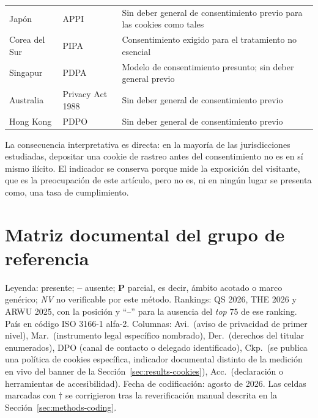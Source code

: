 \documentclass[pdflatex,sn-basic,Numbered]{sn-jnl}
\newcommand{\si}{\ding{51}}
\newcommand{\no}{\textcolor{gris}{\textbf{--}}}
\newcommand{\nv}{\textsl{\footnotesize NV}}
\theoremstyle{thmstyleone}
\theoremstyle{thmstyletwo}
\theoremstyle{thmstylethree}
\begin{document}
\begin{appendices}
\begin{longtable}{@{}>{\RaggedRight}p{2.4cm}>{\RaggedRight}p{5.5cm}>{\RaggedRight\arraybackslash}p{4.1cm}@{}}
	\addlinespace
	Jap\'on & APPI \citep{appi2003} & Sin deber general de consentimiento previo para las cookies como tales \\
	\addlinespace
	Corea del Sur & PIPA \citep{pipa2011} & Consentimiento exigido para el tratamiento no esencial \\
	\addlinespace
	Singapur & PDPA \citep{pdpa2012} & Modelo de consentimiento presunto; sin deber general previo \\
	\addlinespace
	Australia & Privacy Act 1988 \citep{privacyact1988} & Sin deber general de consentimiento previo \\
	\addlinespace
	Hong Kong & PDPO \citep{pdpo_hk} & Sin deber general de consentimiento previo \\
\end{longtable}
\normalsize

La consecuencia interpretativa es directa: en la mayor\'ia de las jurisdicciones estudiadas, depositar una cookie de rastreo antes del consentimiento no es en s\'i mismo il\'icito. El indicador se conserva porque mide la exposici\'on del visitante, que es la preocupaci\'on de este art\'iculo, pero no es, ni en ning\'un lugar se presenta como, una tasa de cumplimiento.

\section{Matriz documental del grupo de referencia}\label{ap:mundo}
\setcounter{table}{0}\setcounter{figure}{0}

Leyenda: \si{} presente; \no{} ausente; \textbf{P} parcial, es decir, \'ambito acotado o marco gen\'erico; \nv{} no verificable por este m\'etodo. Rankings: QS 2026, THE 2026 y ARWU 2025, con la posici\'on y ``--'' para la ausencia del \emph{top} 75 de ese ranking. Pa\'is en c\'odigo ISO 3166-1 alfa-2. Columnas: Avi.\ (aviso de privacidad de primer nivel), Mar.\ (instrumento legal espec\'ifico nombrado), Der.\ (derechos del titular enumerados), DPO (canal de contacto o delegado identificado), Ckp.\ (se publica una pol\'itica de cookies espec\'ifica, indicador documental distinto de la medici\'on en vivo del banner de la Secci\'on~\ref{sec:results-cookies}), Acc.\ (declaraci\'on o herramientas de accesibilidad). Fecha de codificaci\'on: agosto de 2026. Las celdas marcadas con $\dagger$ se corrigieron tras la reverificaci\'on manual descrita en la Secci\'on~\ref{sec:methods-coding}.


\end{appendices}
\end{document}
